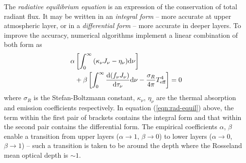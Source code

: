 				The \textit{radiative equilibrium equation} is an expression of the conservation of total radiant flux. It may be written in an \textit{integral form} -- more accurate at upper atmospheric layer, or in a \textit{differential form} -- more accurate in deeper layers. To improve the accuracy, numerical algorithms implement a linear combination of both form as
				\begin{align}
					\alpha&\left[ \int_{0}^{\infty}{(\kappa_\nu J_\nu-\eta_\nu)\mathrm{d}\nu} \right] \nonumber\\
						&+\beta\left[ \int_{0}^{\infty}{\dfrac{\mathrm{d}(f_\nu J_\nu)}{\mathrm{d}\tau_\nu}\mathrm{d}\nu}-\dfrac{\sigma_R}{4\pi}T_\text{eff}^4 \right]=0 \label{eqn:rad-equil}
				\end{align}
				where $\sigma_R$ is the Stefan-Boltzmann constant, $\kappa_\nu$, $\eta_\nu$ are the thermal absorption and emission coefficients respectively. In equation (\ref{eqn:rad-equil}) above, the term within the first pair of brackets contains the integral form and that within the second pair contains the differential form. The empirical coefficients $\alpha$, $\beta$ enable a transition from upper layers ($\alpha\rightarrow 1$, $\beta\rightarrow 0$) to lower layers ($\alpha\rightarrow 0$, $\beta\rightarrow 1$) -- such a transition is taken to be around the depth where the Rosseland mean optical depth is $\sim 1$.
				
